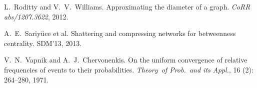 \begin{thebibliography}{33}
L.~Roditty and V.~V.~Williams.
\newblock Approximating the diameter of a graph.
\newblock \emph{CoRR abs/1207.3622}, 2012.

A.~E.~Sariy\"{u}ce et al.
\newblock Shattering and compressing networks for betweenness centrality.
\newblock SDM'13, 2013.

V.~N.~Vapnik and A.~J.~Chervonenkis.
\newblock On the uniform convergence of relative frequencies of events to their
  probabilities.
\newblock \emph{Theory~of Prob.~and its Appl.}, 16
  (2): 264--280, 1971.

\end{thebibliography}

